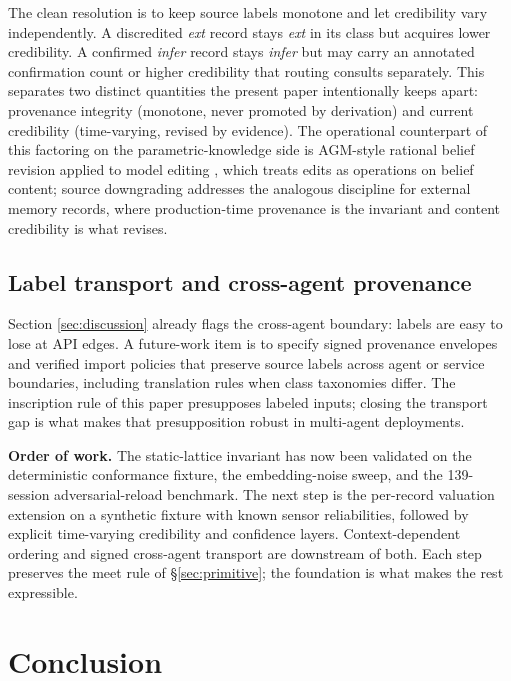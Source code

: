 \documentclass[11pt]{article}
\begin{document}
The clean resolution is to keep source labels monotone and let credibility vary independently. A discredited \emph{ext} record stays \emph{ext} in its class but acquires lower credibility. A confirmed \emph{infer} record stays \emph{infer} but may carry an annotated confirmation count or higher credibility that routing consults separately. This separates two distinct quantities the present paper intentionally keeps apart: provenance integrity (monotone, never promoted by derivation) and current credibility (time-varying, revised by evidence). The operational counterpart of this factoring on the parametric-knowledge side is AGM-style rational belief revision applied to model editing \cite{Hase2024ModelEditing}, which treats edits as operations on belief content; source downgrading addresses the analogous discipline for external memory records, where production-time provenance is the invariant and content credibility is what revises.

\subsection{Label transport and cross-agent provenance}

Section \ref{sec:discussion} already flags the cross-agent boundary: labels are easy to lose at API edges. A future-work item is to specify signed provenance envelopes and verified import policies that preserve source labels across agent or service boundaries, including translation rules when class taxonomies differ. The inscription rule of this paper presupposes labeled inputs; closing the transport gap is what makes that presupposition robust in multi-agent deployments.

\medskip
\noindent\textbf{Order of work.} The static-lattice invariant has now been validated on the deterministic conformance fixture, the embedding-noise sweep, and the 139-session adversarial-reload benchmark. The next step is the per-record valuation extension on a synthetic fixture with known sensor reliabilities, followed by explicit time-varying credibility and confidence layers. Context-dependent ordering and signed cross-agent transport are downstream of both. Each step preserves the meet rule of \S\ref{sec:primitive}; the foundation is what makes the rest expressible.

\section{Conclusion}
\label{sec:conclusion}
\end{document}
